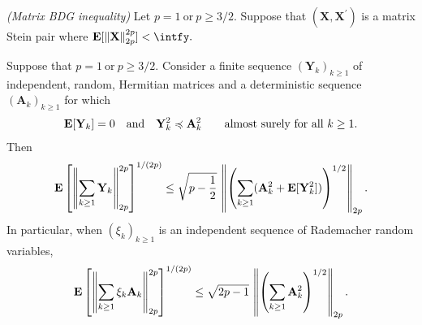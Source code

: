 \begin{theorem}
  \emph{(Matrix BDG inequality)}
  Let
  $
    p = 1
    \ 
    \text{or}\ 
    p \ge 3/2
    .
  $
  Suppose that 
  $
  (
    \mathbf{X}
   , 
   \mathbf{X}^{'}
  )
  $
  is a matrix Stein pair where
  $
   \E
   [ 
    \norm{\mathbf{X}}
    _{2p}^{2p}
   ]
   <
   \intfy
   .
  $
\end{theorem}




\begin{ftheorem}
  \emph{\cite[Corollary~7.3]{Mackey2014}}
  Suppose that
  $
    p = 1
    \ 
    \text{or}\ 
    p \ge 3/2
    .
  $
  Consider a finite sequence
  $
    (\mathbf{Y}_k)_{k\ge 1}
  $
  of independent, random, Hermitian matrices 
  and a deterministic sequence
  $
    (\mathbf{A}_k)_{k\ge 1}
  $
  for which
  \begin{gather}
    \E[\mathbf{Y}_k]
    =
    0
    \quad 
    \text{and}
    \quad
    \mathbf{Y}_k^2
    \preccurlyeq
    \mathbf{A}_k^2
    \qquad
    \text{almost surely for all}\ 
    k \ge 1.
  \end{gather}
  Then
  \begin{gather}
      \mathbf{E}
      \left[
        \left\lVert
          \sum_{k\ge 1}
            \mathbf{Y}_k
        \right\rVert
        _{2p}
        ^{2p}
      \right]
      ^{1/(2p)}
      \le
      \sqrt{
        p - \frac{1}{2}
      }
      \,
      \left\lVert
        \left( 
          \sum_{k\ge 1}
          (
            \mathbf{A}_k^2
            + 
            \mathbf{E}[
              \mathbf{Y}_k^2
            ]
          )
        \right)
        ^{1/2}
        \right\rVert
      _{2p}
      .
  \end{gather}
  In particular, when 
  $
    (\xi_k)_{k\ge 1}
  $
  is an independent sequence of Rademacher random variables,
  \begin{gather}
      \mathbf{E}
      \left[
        \left\lVert
          \sum_{k\ge 1}
            \xi_k
            \mathbf{A}_k
        \right\rVert
        _{2p}
        ^{2p}
      \right]
      ^{1/(2p)}
      \le
      \sqrt{
        2p - 1
        }
      \,
      \left\lVert
        \left( 
          \sum_{k\ge 1}
            \mathbf{A}_k^2
        \right)
        ^{1/2}
        \right\rVert
      _{2p}
      .
  \end{gather}
\end{ftheorem}
